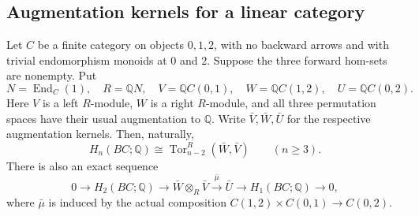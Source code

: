 \subsection{Augmentation kernels for a linear category}

\begin{proposition}\label{C:linear-augmentation-Tor}
Let $C$ be a finite category on objects $0,1,2$, with no
backward arrows and with trivial endomorphism monoids at
$0$ and $2$.  Suppose the three forward hom-sets are nonempty.
Put
\[
 N=\operatorname{End}_C(1),\quad R=\mathbb QN,\quad
 V=\mathbb QC(0,1),\quad W=\mathbb QC(1,2),\quad
 U=\mathbb QC(0,2).
\]
Here $V$ is a left $R$-module, $W$ is a right $R$-module,
and all three permutation spaces have their usual
augmentation to $\mathbb Q$.  Write $\bar V,\bar W,\bar U$
for the respective augmentation kernels.  Then, naturally,
\begin{equation}\label{C:linear-augmentation-high}
 H_n(BC;\mathbb Q)\cong
 \operatorname{Tor}^{R}_{n-2}(\bar W,\bar V)
 \qquad(n\geq3).
\end{equation}
There is also an exact sequence
\[
 0\longrightarrow H_2(BC;\mathbb Q)
 \longrightarrow\bar W\otimes_R\bar V
 \xrightarrow{\bar\mu}\bar U
 \longrightarrow H_1(BC;\mathbb Q)
 \longrightarrow0,
\]
where $\bar\mu$ is induced by the actual composition
$C(1,2)\times C(0,1)\to C(0,2)$.
\end{proposition}
